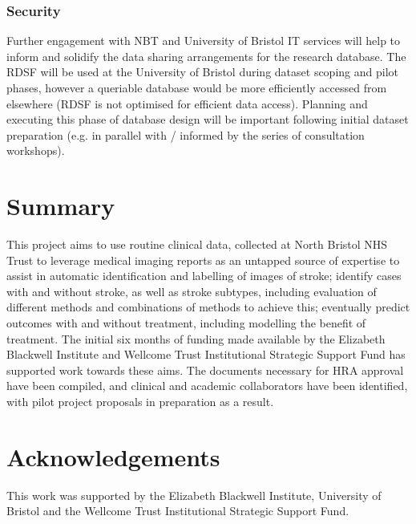 \documentclass{article}
\begin{document}
\subsubsection{Security}

Further engagement with NBT and University of Bristol IT services will
help to inform and solidify the data sharing arrangements for the
research database. The RDSF will be used at the University of Bristol
during dataset scoping and pilot phases, however a queriable database
would be more efficiently accessed from elsewhere (RDSF is not
optimised for efficient data access). Planning and executing this
phase of database design will be important following initial dataset
preparation (e.g. in parallel with / informed by the series of
consultation workshops).

\section{Summary}

This project aims to use routine clinical data, collected at North
Bristol NHS Trust to leverage medical imaging reports as an untapped
source of expertise to assist in automatic identification and
labelling of images of stroke; identify cases with and without stroke,
as well as stroke subtypes, including evaluation of different methods
and combinations of methods to achieve this; eventually predict
outcomes with and without treatment, including modelling the benefit
of treatment. The initial six months of funding made available by the
Elizabeth Blackwell Institute and Wellcome Trust Institutional
Strategic Support Fund has supported work towards these aims. The
documents necessary for HRA approval have been compiled, and clinical
and academic collaborators have been identified, with pilot project
proposals in preparation as a result. 

\section*{Acknowledgements}

This work was supported by the Elizabeth Blackwell Institute, University of Bristol and the Wellcome
Trust Institutional Strategic Support Fund.




\appendix
\end{document}
